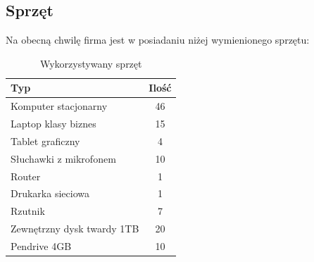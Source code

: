\documentclass{article}
\begin{document}
        \subsection{Sprzęt}
            Na obecną chwilę firma jest w posiadaniu niżej wymienionego sprzętu:
            \begin{table}[H]
                \centering
                \begin{tabular}{ | l | c | }
                    \hline
                    \textbf{Typ} & \textbf{Ilość} \\
                    \hline
                    Komputer stacjonarny & 46 \\
                    \hline
                    Laptop klasy biznes & 15 \\
                    \hline
                    Tablet graficzny & 4 \\
                    \hline
                    Słuchawki z mikrofonem & 10 \\
                    \hline
                    Router & 1 \\
                    \hline
                    Drukarka sieciowa & 1 \\
                    \hline
                    Rzutnik & 7 \\
                    \hline
                    Zewnętrzny dysk twardy 1TB & 20 \\
                    \hline
                    Pendrive 4GB & 10 \\
                    \hline
                \end{tabular}
                \caption{Wykorzystywany sprzęt}
            \end{table}
\end{document}
